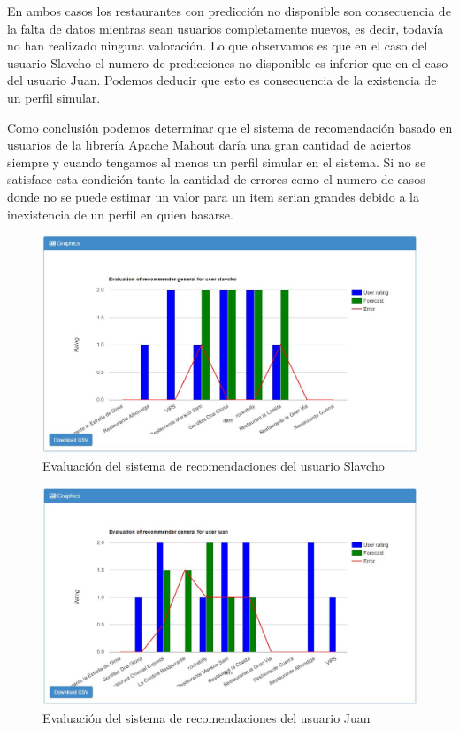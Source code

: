 En ambos casos los restaurantes con predicción no disponible son consecuencia de la falta de datos mientras sean usuarios completamente nuevos, es decir, todavía no han realizado ninguna valoración. Lo que observamos es que en el caso del usuario Slavcho el numero de predicciones no disponible es inferior que en el caso del usuario Juan. Podemos deducir que esto es consecuencia de la existencia de un perfil simular.

Como conclusión podemos determinar que el sistema de recomendación basado en usuarios de la librería Apache Mahout daría una gran cantidad de aciertos siempre y cuando tengamos al menos un perfil simular en el sistema. Si no se satisface esta condición tanto la cantidad de errores como el numero de casos donde no se puede estimar un valor para un item serian grandes debido a la inexistencia de un perfil en quien basarse.

\begin{figure}[H]
	\centering\includegraphics[scale=0.4]{imagenes/explotacion/simulacion/errores-slavcho.jpg}
	\caption{Evaluación del sistema de recomendaciones del usuario Slavcho}
	\label{evaluarSlavcho}
\end{figure}

\begin{figure}[H]
	\centering\includegraphics[scale=0.4]{imagenes/explotacion/simulacion/errores-juan.jpg}
	\caption{Evaluación del sistema de recomendaciones del usuario Juan}
	\label{evaluarJuan}
\end{figure} 

